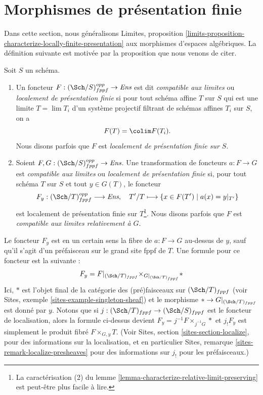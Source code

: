 \section{Morphismes de présentation finie}
\label{section-finite-presentation}

\noindent
Dans cette section, nous généralisons
Limites, proposition
\ref{limits-proposition-characterize-locally-finite-presentation}
aux morphismes d'espaces algébriques.
La définition suivante est motivée par
la proposition que nous venons de citer.

\begin{definition}
\label{definition-locally-finite-presentation}
Soit $S$ un schéma.
\begin{enumerate}
\item Un foncteur $F : (\Sch/S)_{fppf}^{opp} \to \textit{Ens}$
est dit {\it compatible aux limites} ou {\it localement de présentation finie} si
pour tout schéma affine $T$ sur $S$ qui est une limite $T = \lim T_i$
d'un système projectif filtrant de schémas affines $T_i$ sur $S$, on a
$$
F(T) = \colim F(T_i).
$$
Nous disons parfois que $F$ est {\it localement de présentation finie sur $S$}.
\item Soient $F, G : (\Sch/S)_{fppf}^{opp} \to \textit{Ens}$.
Une transformation de foncteurs $a : F \to G$
est {\it compatible aux limites} ou {\it localement de présentation finie}
si, pour tout schéma $T$ sur $S$ et tout $y \in G(T)$, le foncteur
$$
F_y : (\Sch/T)_{fppf}^{opp} \longrightarrow \textit{Ens}, \quad
T'/T \longmapsto \{x \in F(T') \mid a(x) = y|_{T'}\}
$$
est localement de présentation finie sur $T$\footnote{La caractérisation (2) du
lemme \ref{lemma-characterize-relative-limit-preserving}
est peut-être plus facile à lire.}. Nous disons parfois que
$F$ est {\it compatible aux limites relativement à $G$}.
\end{enumerate}
\end{definition}

\noindent
Le foncteur $F_y$ est en un certain sens la fibre de
$a : F \to G$ au-dessus de $y$, sauf qu'il s'agit d'un préfaisceau sur le grand site fppf
de $T$. Une formule pour ce foncteur est la suivante :
\begin{equation}
\label{equation-fibre-map-functors}
F_y =
F|_{(\Sch/T)_{fppf}}
{\times}_{G|_{(\Sch/T)_{fppf}}}
*
\end{equation}
Ici, $*$ est l'objet final de la catégorie des (pré)faisceaux
sur $(\Sch/T)_{fppf}$ (voir
Sites, exemple \ref{sites-example-singleton-sheaf})
et le morphisme $* \to G|_{(\Sch/T)_{fppf}}$ est donné par $y$.
Notons que si $j : (\Sch/T)_{fppf} \to (\Sch/S)_{fppf}$
est le foncteur de localisation, alors la formule ci-dessus devient
$F_y = j^{-1}F \times_{j^{-1}G} *$ et $j_!F_y$ est simplement le produit fibré
$F \times_{G, y} T$. (Voir
Sites, section \ref{sites-section-localize},
pour des informations sur la localisation, et en particulier
Sites, remarque \ref{sites-remark-localize-presheaves}
pour des informations sur $j_!$ pour les préfaisceaux.)

